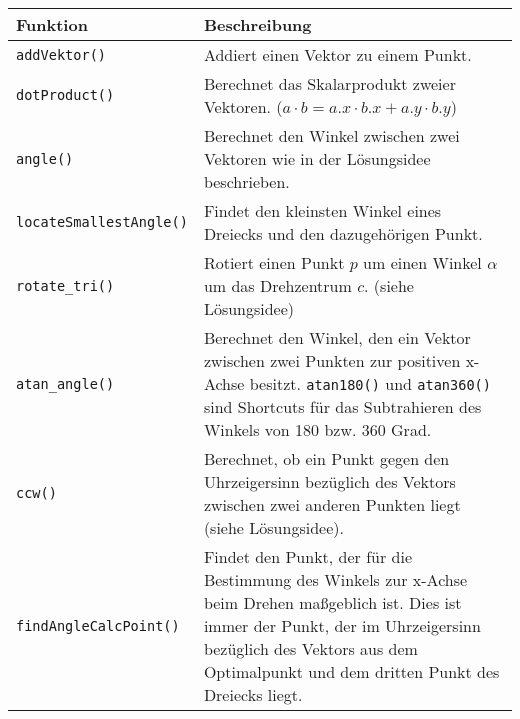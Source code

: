 \documentclass[a4paper, notitlepage, 12pt,headinclude]{scrartcl}
\begin{document}
{\begin{tabu} to \linewidth {lX}
	Funktion & Beschreibung \\ \hline
	\texttt{addVektor()} & Addiert einen Vektor zu einem Punkt. \\ \hline
	\texttt{dotProduct()} & Berechnet das Skalarprodukt zweier Vektoren. ($a \cdot b = a.x \cdot b.x + a.y \cdot b.y$) \\ \hline
	\texttt{angle()} & Berechnet den Winkel zwischen zwei Vektoren wie in der Lösungsidee beschrieben.\\ \hline
	\texttt{locateSmallestAngle()} &  Findet den kleinsten Winkel eines Dreiecks und den dazugehörigen Punkt.\\ \hline
	\texttt{rotate\_tri()} & Rotiert einen Punkt $p$ um einen Winkel $\alpha$ um das Drehzentrum $c$. (siehe Lösungsidee)\\ \hline
	\texttt{atan\_angle()}& Berechnet den Winkel, den ein Vektor zwischen zwei Punkten zur positiven x-Achse besitzt. \texttt{atan180()} und \texttt{atan360()} sind Shortcuts für das Subtrahieren des Winkels von 180 bzw. 360 Grad. \\ \hline
	\texttt{ccw()} & Berechnet, ob ein Punkt gegen den Uhrzeigersinn bezüglich des Vektors zwischen zwei anderen Punkten liegt (siehe Lösungsidee).\\ \hline
	\texttt{findAngleCalcPoint()} & Findet den Punkt, der für die Bestimmung des Winkels zur x-Achse beim Drehen maßgeblich ist. Dies ist immer der Punkt, der im Uhrzeigersinn bezüglich des Vektors aus dem Optimalpunkt und dem dritten Punkt des Dreiecks liegt.\\
\end{tabu}}
\end{document}
